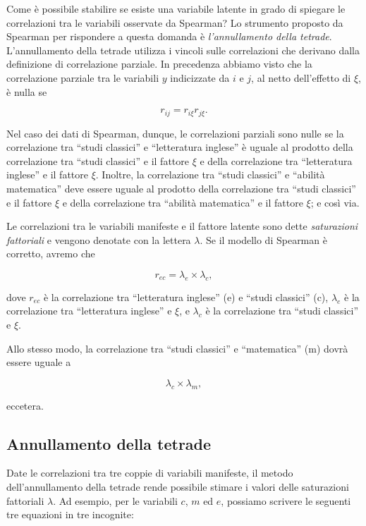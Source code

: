 \documentclass[
  11pt,
]{krantz}
\theoremstyle{definition}
\theoremstyle{definition}
\theoremstyle{definition}
\theoremstyle{definition}
\theoremstyle{remark}
\begin{document}
Come è possibile stabilire se esiste una variabile latente in grado di spiegare le correlazioni tra le variabili osservate da Spearman? Lo strumento proposto da Spearman per rispondere a questa domanda è \emph{l'annullamento della tetrade}. L'annullamento della tetrade utilizza i vincoli sulle correlazioni che derivano dalla definizione di correlazione parziale. In precedenza abbiamo visto che la correlazione parziale tra le variabili \(y\) indicizzate da \(i\) e \(j\), al netto dell'effetto di \(\xi\), è nulla se

\[
r_{ij} = r_{i\xi}r_{j\xi}.
\]

Nel caso dei dati di Spearman, dunque, le correlazioni parziali sono nulle se la correlazione tra ``studi classici'' e ``letteratura inglese'' è uguale al prodotto della correlazione tra ``studi classici'' e il fattore \(\xi\) e della correlazione tra ``letteratura inglese'' e il fattore \(\xi\). Inoltre, la correlazione tra ``studi classici'' e ``abilità matematica'' deve essere uguale al prodotto della correlazione tra ``studi classici'' e il fattore \(\xi\) e della correlazione tra ``abilità matematica'' e il fattore \(\xi\); e così via.

Le correlazioni tra le variabili manifeste e il fattore latente sono dette \emph{saturazioni fattoriali} e vengono denotate con la lettera \(\lambda\). Se il modello di Spearman è corretto, avremo che

\[
r_{ec}=\lambda_e \times \lambda_{c},
\]

dove \(r_{ec}\) è la correlazione tra ``letteratura inglese'' (e) e ``studi classici'' (c), \(\lambda_e\) è la correlazione tra ``letteratura inglese'' e \(\xi\), e \(\lambda_{c}\) è la correlazione tra ``studi classici'' e \(\xi\).

Allo stesso modo, la correlazione tra ``studi classici'' e ``matematica'' (m) dovrà essere uguale a

\[
\lambda_c \times \lambda_m,
\]

eccetera.

\hypertarget{annullamento-della-tetrade}{%
\subsection{Annullamento della tetrade}\label{annullamento-della-tetrade}}

Date le correlazioni tra tre coppie di variabili manifeste, il metodo dell'annullamento della tetrade rende possibile stimare i valori delle saturazioni fattoriali \(\lambda\). Ad esempio, per le variabili \(c\), \(m\) ed \(e\), possiamo scrivere le seguenti tre equazioni in tre incognite:
\end{document}
